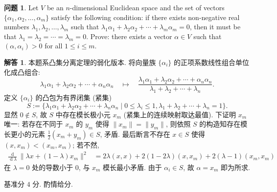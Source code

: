 \documentclass{MainStyle}
\theoremstyle{definition}
\newtheorem{problem}{问题}
\newtheorem{solution}{解答}
\begin{document}
\begin{problem}
Let $V$ be an $n$-dimensional Euclidean space and the set of vectors $\{\alpha_1,\alpha_2,\ldots ,\alpha_m\}$ satisfy the following condition: if there exists non-negative real numbers $\lambda_1,\lambda_2,\ldots, \lambda_m$ such that $\lambda_1\alpha_1+\lambda_2\alpha_2+\cdots +\lambda_m\alpha_m=0$, then it must be that $\lambda_1=\lambda_2=\cdots =\lambda_m=0$. Prove: there exists a vector $\alpha\in V$ such that $(\alpha,\alpha_i)>0$ for all $1\leq i\leq m$.
\end{problem}

\begin{solution}
    本题系凸集分离定理的弱化版本. 将向量族 $\{\alpha_i\}$ 的正项系数线性组合单位化成凸组合:
    \begin{equation*}
        \lambda_1\alpha_1+\lambda_2\alpha_2+\cdots +\alpha_n\alpha_n\quad \mapsto \quad \frac{\lambda_1\alpha_1+\lambda_2\alpha_2+\cdots +\alpha_n\alpha_n}{\lambda_1+\lambda_2 +\cdots +\lambda_n}.
    \end{equation*}
    定义 $\{\alpha_i\}$ 的凸包为有界闭集 (紧集)
    \begin{equation*}
        S:=\{\lambda_1\alpha_1+\lambda_2\alpha_2+\cdots +\lambda_n\alpha_n\mid 0\leq \lambda_i\leq 1,\lambda_1+\lambda_2+\cdots +\lambda_n=1\}.
    \end{equation*}
    显然 $0\notin S$, 故 $S$ 中存在模长极小元 $x_m$ (紧集上的连续映射取达最值). 下证明 $x_m$ 唯一: 若存在不同于 $x_m$ 的 $y_m$ 使得 $\|x_m\|=\|y_m\|$, 则依照 $S$ 的构造知存在模长更小的元素 $\frac{1}{2}(x_m+y_m)\in S$, 矛盾. 最后断言不存在 $x\in S$ 使得 $(x,x_m)<(x_m,x_m)$; 若不然,
    \begin{align*}
        \frac{\operatorname d}{\operatorname d\lambda}\|\lambda x+(1-\lambda)x_m\|^2 & =2\lambda (x,x)+2(1-2\lambda)(x,x_m)+2(\lambda-1)(x_m,x_m)
    \end{align*}
    在 $\lambda=0$ 处的导数小于 $0$, 与 $x_m$ 模长最小矛盾. 由于 $\alpha_i\in S$, 故 $\alpha=x_m$ 即为所求.
\end{solution}

\begin{evaluation}
    基准分 $4$ 分. 酌情给分.
\end{evaluation}
\end{document}
